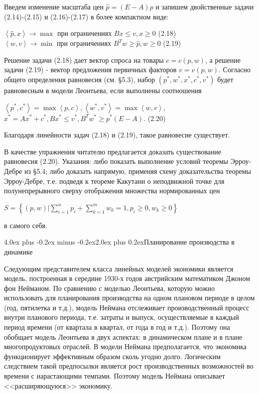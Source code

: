 \documentclass[12pt, 4paper]{book}
\makeatletter
\renewcommand{\section}{\@startsection{section}{1}{1pt}%
	{4.0ex plus -0.2ex minus -0.2ex}{2.0ex plus 0.2ex}{\centering\bf}}%
\makeatother
\begin{document}
{Введем изменение масштаба цен $\hat{p}=(E-A)p$ и запишем двойственные задачи (2.14)-(2.15) и (2.16)-(2.17) в более компактном виде:
\begin{center} 
$\left\langle \hat{p},x \right\rangle \rightarrow \max$ при ограничениях $Bx \leq v, x \geq 0$ (2.18)\\
$\left\langle w,v\right\rangle \rightarrow \min$ при ограничениях $B^T w \geq \hat{p}, w\geq0$ (2.19)
\end{center}
Решение задачи (2.18) дает вектор спроса на товары $c = c(p,w)$, а решение задачи (2.19) - вектор предложения первичных факторов $v=v(p,w)$.
Согласно общего определения равновесия (см. §5.3), набор $(p^{*},w^{*},x^{*},c^{*},v^{*})$ будет равновесным в модели Леонтьева, если выполнены соотношения
\begin{center}
$\left\langle p^{*},c^{*} \right\rangle =\max \left\langle p,c\right\rangle, \left\langle w^{*},v^{*} \right\rangle = \max \left\langle w,v \right\rangle,$\\
$x^{*} = Ax^{*}+c^{*},Bx^{*} \leq v^{*}, B^Tw^{*} \geq p^{*}(E-A).$ (2.20)
\end{center}
\par

Благодаря линейности задач (2.18) и (2.19), такое равновесие существует.
\par

В качестве упражнения читателю предлагается доказать существование равновесия (2.20). Указания: либо показать выполнение условий теоремы Эрроу-Дебре из §5.4; либо доказать напрямую, применяя схему доказательства теоремы Эрроу-Дебре, т.е. подведя к теореме Какутани о неподвижной точке для полунепрерывного сверху отображения множества нормированных цен
\begin{center}
$S = \left\{(p,w) | \sum\limits_{i=1}^{n}p_i + \sum\limits_{k=1}^{m}w_k = 1,p_i \geq 0, w_k \geq 0 \right\}$
\end{center}
в самого себя.
\newpage
\begin{center}
\section{Планирование производства в динамике}
\end{center}
\par

Следующим представителем класса линейных моделей экономики является модель, построенная в середине 1930-х годов австрийским математиком Джоном фон Нейманом. По сравнению с моделью Леонтьева, которую можно использовать для планирования производства на одном плановом периоде в целом (год, пятилетка и т.д.), модель Неймана отслеживает производственный процесс внутри планового периода, т.е. затраты и выпуск, осуществляемые в каждый период времени (от квартала в квартал, от года в год и т.д.). Поэтому она обобщает модель Леонтьева в двух аспектах: в динамическом плане и в плане многопродуктовых отраслей. В модели Неймана предполагается, что экономика функционирует эффективным образом сколь угодно долго. Логическим следствием такой предпосылки является рост производственных возможностей во времени с нарастающими темпами. Поэтому модель Неймана описывает <<расширяющуюся>> экономику.
\par

}
\end{document}
